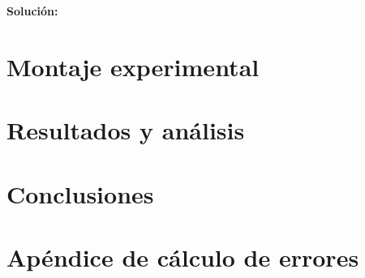 \documentclass[a4paper, amsfonts, amssymb, amsmath, reprint, showkeys, nofootinbib, twoside]{revtex4-1}
\begin{document}
\begin{enumerate}
\textbf{Solución:}

\end{enumerate}

\section{Montaje experimental}

\section{Resultados y análisis}

\section{Conclusiones}




\section*{Apéndice de cálculo de errores}
\end{document}
